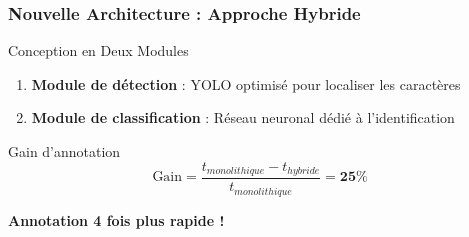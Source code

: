 \documentclass[
	11pt,
	aspectratio=169,
]{beamer}
\begin{document}
\begin{frame}
	\frametitle{Nouvelle Architecture : Approche Hybride}
	
	\begin{block}{Conception en Deux Modules}
		\begin{enumerate}
			\item \textbf{Module de détection} : YOLO optimisé pour localiser les caractères
			\item \textbf{Module de classification} : Réseau neuronal dédié à l'identification
		\end{enumerate}
	\end{block}
	
	\bigskip
	
	\begin{exampleblock}{Gain d'annotation}
		\begin{equation*}
			\text{Gain} = \frac{t_{monolithique} - t_{hybride}}{t_{monolithique}} = \mathbf{25\%}
		\end{equation*}
	\end{exampleblock}
	
	\bigskip
	
	\textbf{Annotation 4 fois plus rapide !}
\end{frame}

\end{document}
